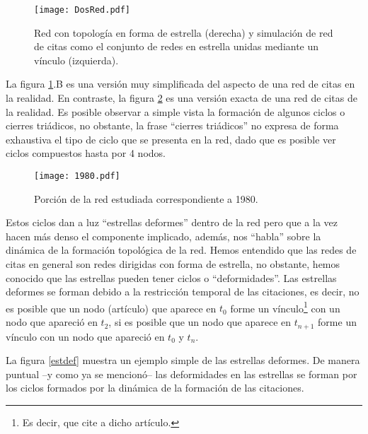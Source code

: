 \documentclass[12pt,letter]{article}
\begin{document}
\vspace{0.5cm}

\begin{figure}[h!]
\centering
\texttt{[image: DosRed.pdf]}
\caption{\small{Red con topología en forma de estrella (derecha) y simulación de red de citas como el conjunto de redes en estrella unidas mediante un vínculo (izquierda).}} \label{DosRed}
\end{figure}

\vspace{0.5cm}

La figura \ref{DosRed}.B es una versión muy simplificada del aspecto de una red de citas en la realidad. En contraste, la figura \ref{1980} es una versión exacta de una red de citas de la realidad. Es posible observar a simple vista la formación de algunos ciclos o cierres triádicos, no obstante, la frase ``cierres triádicos'' no expresa de forma exhaustiva el tipo de ciclo que se presenta en la red, dado que es posible ver ciclos compuestos hasta por 4 nodos.

\vspace{0.5cm}

\begin{figure}[h!]
\centering
\texttt{[image: 1980.pdf]}
\caption{\small{Porción de la red estudiada correspondiente a 1980.}} \label{1980}
\end{figure}

\vspace{0.5cm}


Estos ciclos dan a luz ``estrellas deformes'' dentro de la red pero que a la vez hacen más denso el componente implicado, además, nos ``habla'' sobre la dinámica de la formación topológica de la red. Hemos entendido que las redes de citas en general son redes dirigidas con forma de estrella, no obstante, hemos conocido que las estrellas pueden tener ciclos o ``deformidades''. Las estrellas deformes se forman debido a la restricción temporal de las citaciones, es decir, no es posible que un nodo (artículo) que aparece en $t_{0}$ forme un vínculo\footnote{Es decir, que cite a dicho artículo.} con un nodo que apareció en $t_{2}$, si es posible que un nodo que aparece en $t_{n+1}$ forme un vínculo con un nodo que apareció en $t_{0}$ y $t_{n}$. 

\vspace{0.5cm}

La figura \ref{estdef} muestra un ejemplo simple de las estrellas deformes. De manera puntual --y como ya se mencionó-- las deformidades en las estrellas se forman por los ciclos formados por la dinámica de la formación de las citaciones.
\end{document}
